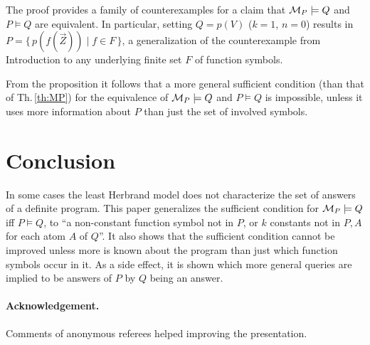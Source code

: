\documentclass[a4paper]{tlp2}
\newcommand*{\M}{{\ensuremath{\cal M}}\xspace}
\begin{document}
The proof provides a family of counterexamples for a claim that 
$\M_P\models Q$ and $P\models Q$ are equivalent.
In particular, setting $Q=p(V)$ ($k=1$, $n=0$) results in 
$P = \{\, p(f(\vec Z)) \mid f\in F \,\}$,
a generalization 
of the counterexample from Introduction to any underlying
finite set $F$ of function symbols.




From the proposition it follows that a more general sufficient condition
(than that of Th.\,\ref{th:MP}) for
the equivalence of $\M_P\models Q$ and $P\models Q$ is impossible,
unless it uses more information about $P$ than just the set of involved symbols.


\section{Conclusion}

In some cases the least Herbrand model does not characterize the set of
answers of a definite program.  
This paper generalizes the sufficient condition for
$\M_P\models Q$ iff $P\models Q$, to
``a non-constant function symbol not in $P$, or $k$ constants not in $P,A$
for each atom $A$ of $Q$''.
It also shows
that the sufficient condition cannot be improved unless more is
known about the program than just which function symbols occur in it.
  As a side effect, it is shown
  which more general queries are implied to be answers of $P$ by $Q$ being an
  answer. 





\paragraph{Acknowledgement.}
Comments of anonymous referees helped improving the presentation.



\end{document}
